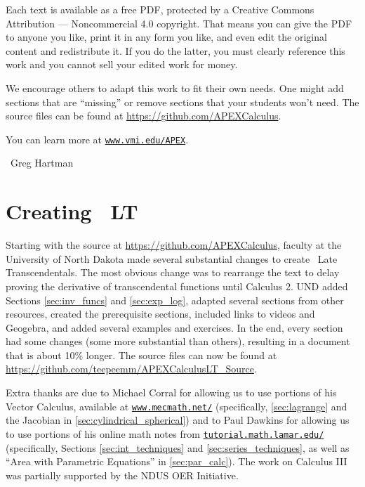 Each text is available as a free PDF, protected by a Creative Commons Attribution --- Noncommercial 4.0 copyright. That means you can give the PDF to anyone you like, print it in any form you like, and even edit the original content and redistribute it. If you do the latter, you must clearly reference this work and you cannot sell your edited work for money.

We encourage others to adapt this work to fit their own needs. One might add sections that are ``missing'' or remove sections that your students won't need. The source files can be found at \url{https://github.com/APEXCalculus}.

You can learn more at \texttt{\href{http://www.vmi.edu/APEX}{www.vmi.edu/APEX}}.

~\hfill Greg Hartman

\section*{Creating \apex~LT}

Starting with the source at \url{https://github.com/APEXCalculus},
faculty at the University of North Dakota made several substantial changes to create \apex\ Late Transcendentals.  The most obvious change was to rearrange the text to delay proving the derivative of transcendental functions until Calculus 2.  UND added Sections \ref{sec:inv_funcs} and \ref{sec:exp_log}, adapted several sections from other resources, created the prerequisite sections, included links to videos and Geogebra, and added several examples and exercises.  In the end, every section had some changes (some more substantial than others), resulting in a document that is about 10\% longer. The source files can now be found at\iflatexml\ \else\\\fi
\url{https://github.com/teepeemm/APEXCalculusLT_Source}.

Extra thanks are due
to Michael Corral for allowing us to use portions of his Vector Calculus, available at \texttt{\href{http://www.mecmath.net/}{www.mecmath.net/}}
(specifically, %
\autoref{sec:lagrange} and the Jacobian in \autoref{sec:cylindrical_spherical})
and
to Paul Dawkins for allowing us to use portions of his online math notes from \texttt{\href{http://tutorial.math.lamar.edu/}{tutorial.math.lamar.edu/}} (specifically, Sections \ref{sec:int_techniques} and \ref{sec:series_techniques}, as well as ``Area with Parametric Equations'' in \autoref{sec:par_calc}).
The work on Calculus III was partially supported by the NDUS OER Initiative.


